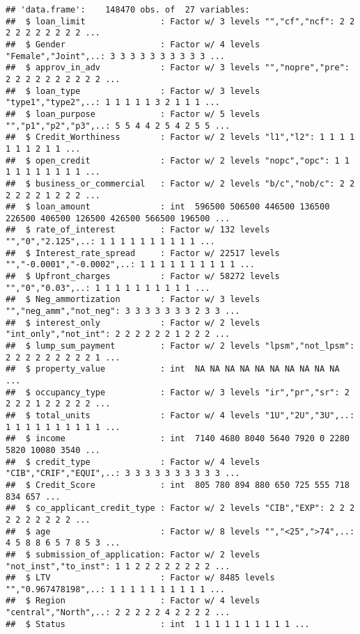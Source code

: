 \documentclass[
]{article}
\begin{document}
\begin{verbatim}
## 'data.frame':    148470 obs. of  27 variables:
##  $ loan_limit               : Factor w/ 3 levels "","cf","ncf": 2 2 2 2 2 2 2 2 2 2 ...
##  $ Gender                   : Factor w/ 4 levels "Female","Joint",..: 3 3 3 3 3 3 3 3 3 3 ...
##  $ approv_in_adv            : Factor w/ 3 levels "","nopre","pre": 2 2 2 2 2 2 2 2 2 2 ...
##  $ loan_type                : Factor w/ 3 levels "type1","type2",..: 1 1 1 1 1 3 2 1 1 1 ...
##  $ loan_purpose             : Factor w/ 5 levels "","p1","p2","p3",..: 5 5 4 4 2 5 4 2 5 5 ...
##  $ Credit_Worthiness        : Factor w/ 2 levels "l1","l2": 1 1 1 1 1 1 1 2 1 1 ...
##  $ open_credit              : Factor w/ 2 levels "nopc","opc": 1 1 1 1 1 1 1 1 1 1 ...
##  $ business_or_commercial   : Factor w/ 2 levels "b/c","nob/c": 2 2 2 2 2 2 1 2 2 2 ...
##  $ loan_amount              : int  596500 506500 446500 136500 226500 406500 126500 426500 566500 196500 ...
##  $ rate_of_interest         : Factor w/ 132 levels "","0","2.125",..: 1 1 1 1 1 1 1 1 1 1 ...
##  $ Interest_rate_spread     : Factor w/ 22517 levels "","-0.0001","-0.0002",..: 1 1 1 1 1 1 1 1 1 1 ...
##  $ Upfront_charges          : Factor w/ 58272 levels "","0","0.03",..: 1 1 1 1 1 1 1 1 1 1 ...
##  $ Neg_ammortization        : Factor w/ 3 levels "","neg_amm","not_neg": 3 3 3 3 3 3 3 2 3 3 ...
##  $ interest_only            : Factor w/ 2 levels "int_only","not_int": 2 2 2 2 2 2 1 2 2 2 ...
##  $ lump_sum_payment         : Factor w/ 2 levels "lpsm","not_lpsm": 2 2 2 2 2 2 2 2 2 1 ...
##  $ property_value           : int  NA NA NA NA NA NA NA NA NA NA ...
##  $ occupancy_type           : Factor w/ 3 levels "ir","pr","sr": 2 2 2 2 1 2 2 2 2 2 ...
##  $ total_units              : Factor w/ 4 levels "1U","2U","3U",..: 1 1 1 1 1 1 1 1 1 1 ...
##  $ income                   : int  7140 4680 8040 5640 7920 0 2280 5820 10080 3540 ...
##  $ credit_type              : Factor w/ 4 levels "CIB","CRIF","EQUI",..: 3 3 3 3 3 3 3 3 3 3 ...
##  $ Credit_Score             : int  805 780 894 880 650 725 555 718 834 657 ...
##  $ co_applicant_credit_type : Factor w/ 2 levels "CIB","EXP": 2 2 2 2 2 2 2 2 2 2 ...
##  $ age                      : Factor w/ 8 levels "","<25",">74",..: 4 5 8 8 6 5 7 8 5 3 ...
##  $ submission_of_application: Factor w/ 2 levels "not_inst","to_inst": 1 1 2 2 2 2 2 2 2 2 ...
##  $ LTV                      : Factor w/ 8485 levels "","0.967478198",..: 1 1 1 1 1 1 1 1 1 1 ...
##  $ Region                   : Factor w/ 4 levels "central","North",..: 2 2 2 2 2 4 2 2 2 2 ...
##  $ Status                   : int  1 1 1 1 1 1 1 1 1 1 ...
\end{verbatim}
\end{document}
